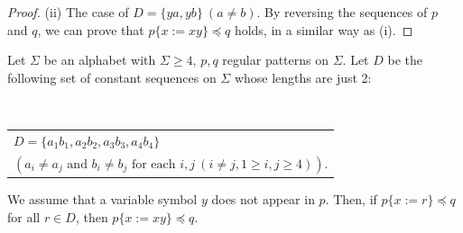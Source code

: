 \begin{proof}
\noindent
(ii) 
The case of $D=\{ ya, yb \} \ (a \ne b)$.
By reversing the sequences of $p$ and $q$, we can prove that $p \{ x := xy \} \preceq q$ holds, in a similar way as (i).
\end{proof}

\begin{lem}\label{補題14}
Let $\Sigma$ be an alphabet with $\Sigma \ge 4$, $p,q$ regular patterns on $\Sigma$.
Let $D$ be the following set of constant sequences on $\Sigma$ whose lengths are just 2:

\medskip
\noindent
~~\begin{tabular}{l}
  $D = \{ a_{1}b_{1}, a_{2}b_{2}, a_{3}b_{3}, a_{4}b_{4} \}$\\
  $(a_{i} \ne a_{j} \mbox{ and } b_{i} \ne b_{j} \mbox{ for each } i,j~(i\ne j, 1\ge i,j\ge 4))$.
\end{tabular}
\medskip

\noindent
We assume that a variable symbol $y$ does not appear in $p$.
Then, if $p \{ x := r \} \preceq q$ for all $r \in D$, then $p \{ x := xy \} \preceq q$.  
\end{lem}
